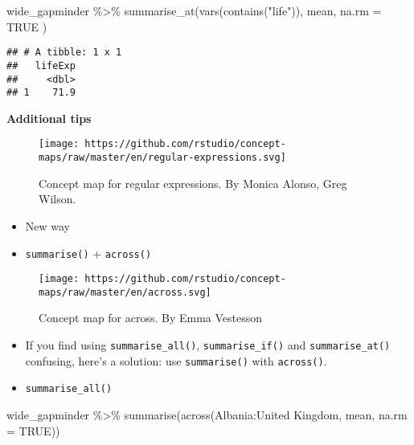 \documentclass[
]{book}
\newenvironment{Shaded}{\begin{snugshade}}{\end{snugshade}}
\newcommand{\AttributeTok}[1]{\textcolor[rgb]{0.77,0.63,0.00}{#1}}
\newcommand{\ConstantTok}[1]{\textcolor[rgb]{0.00,0.00,0.00}{#1}}
\newcommand{\FunctionTok}[1]{\textcolor[rgb]{0.00,0.00,0.00}{#1}}
\newcommand{\NormalTok}[1]{#1}
\newcommand{\SpecialCharTok}[1]{\textcolor[rgb]{0.00,0.00,0.00}{#1}}
\newcommand{\StringTok}[1]{\textcolor[rgb]{0.31,0.60,0.02}{#1}}
\begin{document}
\begin{Shaded}
\begin{Highlighting}[]
\NormalTok{wide\_gapminder }\SpecialCharTok{\%\textgreater{}\%}
  \FunctionTok{summarise\_at}\NormalTok{(}\FunctionTok{vars}\NormalTok{(}\FunctionTok{contains}\NormalTok{(}\StringTok{"life"}\NormalTok{)),}
\NormalTok{    mean,}
    \AttributeTok{na.rm =} \ConstantTok{TRUE}
\NormalTok{  )}
\end{Highlighting}
\end{Shaded}

\begin{verbatim}
## # A tibble: 1 x 1
##   lifeExp
##     <dbl>
## 1    71.9
\end{verbatim}

\textbf{Additional tips}

\begin{figure}
\centering
\texttt{[image: https://github.com/rstudio/concept-maps/raw/master/en/regular-expressions.svg]}
\caption{Concept map for regular expressions. By Monica Alonso, Greg Wilson.}
\end{figure}

\begin{itemize}
\item
  New way
\item
  \texttt{summarise()} + \texttt{across()}
\end{itemize}

\begin{figure}
\centering
\texttt{[image: https://github.com/rstudio/concept-maps/raw/master/en/across.svg]}
\caption{Concept map for across. By Emma Vestesson}
\end{figure}

\begin{itemize}
\item
  If you find using \texttt{summarise\_all()}, \texttt{summarise\_if()} and \texttt{summarise\_at()} confusing, here's a solution: use \texttt{summarise()} with \texttt{across()}.
\item
  \texttt{summarise\_all()}
\end{itemize}

\begin{Shaded}
\begin{Highlighting}[]
\NormalTok{wide\_gapminder }\SpecialCharTok{\%\textgreater{}\%}
  \FunctionTok{summarise}\NormalTok{(}\FunctionTok{across}\NormalTok{(Albania}\SpecialCharTok{:}\StringTok{\textasciigrave{}}\AttributeTok{United Kingdom}\StringTok{\textasciigrave{}}\NormalTok{, mean, }\AttributeTok{na.rm =} \ConstantTok{TRUE}\NormalTok{))}
\end{Highlighting}
\end{Shaded}
\end{document}
